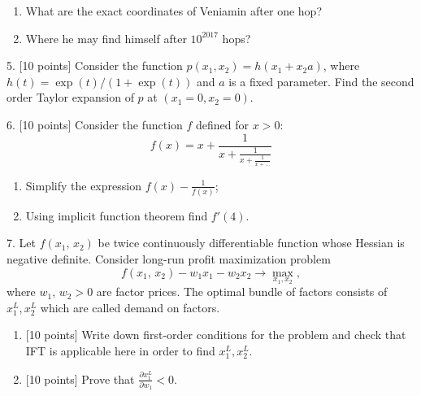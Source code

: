 \documentclass[12pt,a4paper]{article}
\begin{document}
\begin{enumerate}
  \item What are the exact coordinates of Veniamin after one hop?
  \item Where he may find himself after $10^{2017}$ hops?
\end{enumerate}


\newpage
{}

5. {[10 points]} Consider the function $p(x_1, x_2) = h(x_1 + x_2 a)$, where $h(t) = \exp(t)/(1+\exp(t))$ and $a$ is a fixed parameter. Find the second order Taylor expansion of $p$ at $(x_1=0, x_2=0)$.

\newpage
{}

6. {[10 points]} Consider the function $f$ defined for $x>0$:
\[
f(x) = x + \frac{1}{x + \frac{1}{x + \frac{1}{x + \ldots}}}
\]
\begin{enumerate}
  \item Simplify the expression $f(x) - \frac{1}{f(x)}$;
  \item Using implicit function theorem find $f'(4)$.
\end{enumerate}





\newpage
{}

7.  Let $f({x_1},\,{x_2})$ be twice continuously differentiable function whose Hessian is negative definite. Consider long-run profit maximization problem
\[
f({x_1},\,{x_2}) - {w_1}{x_1} - {w_2}{x_2} \to \max_{x_1, x_2},
\]
where ${w_1},\,{w_2} > 0$ are factor prices. The optimal bundle of factors consists of $x_1^L, x_2^L$ which are called demand on factors.
\begin{enumerate}
\item {[10 points]} Write down first-order conditions for the problem and check that IFT is applicable here in order to find $x_1^L, x_2^L$.
\item {[10 points]} Prove that $\frac{{\partial x_1^L}}{{\partial {w_1}}} < 0$.
\end{enumerate}
\end{document}

